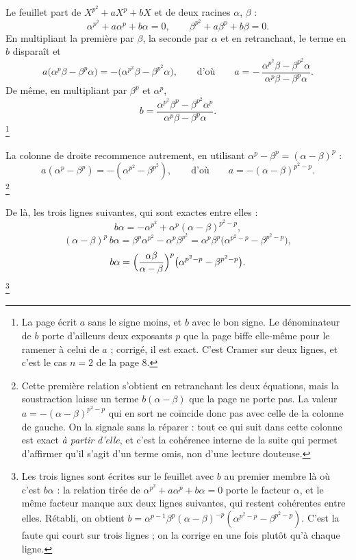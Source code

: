 \documentclass[11pt,a4paper]{article}
\begin{document}
Le feuillet part de $X^{p^2} + aX^p + bX$ et de deux racines $\alpha$,
$\beta$ :
\[
  \alpha^{p^2} + a\alpha^p + b\alpha = 0 , \qquad
  \beta^{p^2} + a\beta^p + b\beta = 0 .
\]
En multipliant la première par $\beta$, la seconde par $\alpha$ et en
retranchant, le terme en $b$ disparaît et
\[
  a\bigl(\alpha^p\beta - \beta^p\alpha\bigr) =
  -\bigl(\alpha^{p^2}\beta - \beta^{p^2}\alpha\bigr) ,
  \qquad\text{d'où}\qquad
  a = -\,\frac{\alpha^{p^2}\beta - \beta^{p^2}\alpha}
              {\alpha^p\beta - \beta^p\alpha} .
\]
De même, en multipliant par $\beta^p$ et $\alpha^p$,
\[
  b = \frac{\alpha^{p^2}\beta^p - \beta^{p^2}\alpha^p}
           {\alpha^p\beta - \beta^p\alpha} .
\]
\footnote{La page écrit $a$ sans le signe moins, et $b$ avec le bon signe. Le
dénominateur de $b$ porte d'ailleurs deux exposants $p$ que la page biffe
elle-même pour le ramener à celui de $a$ ; corrigé, il est exact. C'est
Cramer sur deux lignes, et c'est le cas $n = 2$ de la page 8.}

La colonne de droite recommence autrement, en utilisant $\alpha^p - \beta^p =
(\alpha - \beta)^p$ :
\[
  a(\alpha^p - \beta^p) = -(\alpha^{p^2} - \beta^{p^2}) ,
  \qquad\text{d'où}\qquad a = -(\alpha - \beta)^{p^2 - p} .
\]
\footnote{Cette première relation s'obtient en retranchant les deux
équations, mais la soustraction laisse un terme $b(\alpha - \beta)$ que la
page ne porte pas. La valeur $a = -(\alpha-\beta)^{p^2-p}$ qui en sort ne
coïncide donc pas avec celle de la colonne de gauche. On la signale sans la
réparer : tout ce qui suit dans cette colonne est exact \emph{à partir
d'elle}, et c'est la cohérence interne de la suite qui permet d'affirmer
qu'il s'agit d'un terme omis, non d'une lecture douteuse.}

De là, les trois lignes suivantes, qui sont exactes entre elles :
\[
  b\alpha = -\alpha^{p^2} + \alpha^p(\alpha - \beta)^{p^2 - p} ,
\]
\[
  (\alpha - \beta)^p\, b\alpha =
  \beta^p\alpha^{p^2} - \alpha^p\beta^{p^2}
  = \alpha^p\beta^p\bigl(\alpha^{p^2 - p} - \beta^{p^2 - p}\bigr) ,
\]
\[
  b\alpha = \Bigl(\frac{\alpha\beta}{\alpha - \beta}\Bigr)^{p}
  \bigl(\alpha^{p^2 - p} - \beta^{p^2 - p}\bigr) .
\]
\footnote{Les trois lignes sont écrites sur le feuillet avec $b$ au premier
membre là où c'est $b\alpha$ : la relation tirée de $\alpha^{p^2} + a\alpha^p
+ b\alpha = 0$ porte le facteur $\alpha$, et le même facteur manque aux deux
lignes suivantes, qui restent cohérentes entre elles. Rétabli, on obtient
$b = \alpha^{p-1}\beta^p(\alpha-\beta)^{-p}(\alpha^{p^2-p} -
\beta^{p^2-p})$. C'est la faute qui court sur trois lignes ; on la corrige
en une fois plutôt qu'à chaque ligne.}
\end{document}
